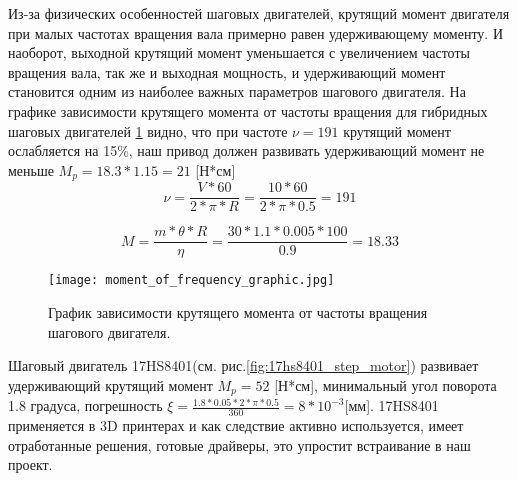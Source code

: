 Из-за физических особенностей шаговых двигателей, крутящий момент двигателя при малых частотах вращения вала примерно равен удерживающему моменту. И наоборот, выходной крутящий момент уменьшается с увеличением частоты вращения вала, так же и выходная мощность, и удерживающий момент становится одним из наиболее важных параметров шагового двигателя. На графике зависимости крутящего момента от частоты вращения для гибридных шаговых двигателей \ref{fig:MomentFrequency} видно, что при частоте $\nu=191$ крутящий момент ослабляется на 15\%, наш привод должен развивать удерживающий момент не меньше $M_{p}=18.3*1.15=21$ [Н*см]
\begin{equation}
\label{eq:frec}
\nu =\frac{V*60}{2*\pi*R}= \frac{10*60}{2*\pi*0.5}=191
\end{equation}

\begin{equation}
\label{eq:moment}
M=\frac{m*\theta*R}{\eta}= \frac{30*1.1*0.005*100}{0.9}=18.33
\end{equation}

\begin{figure}[ht]
	\centering
     \texttt{[image: moment\_of\_frequency\_graphic.jpg]}
	\caption{График зависимости крутящего момента от частоты вращения шагового двигателя.}
	\label{fig:MomentFrequency}
\end{figure}

Шаговый двигатель 17HS8401(см. рис.\ref{fig:17hs8401_step_motor}) развивает удерживающий крутящий момент $M_{p}=52$ [Н*см], минимальный угол поворота 1.8 градуса, погрешность $\xi=\frac{1.8*0.05*2*\pi*0.5}{360}=8*10^{-3} $[мм]. 17HS8401 применяется в 3D принтерах и как следствие активно используется, имеет отработанные решения, готовые драйверы, это упростит встраивание в наш проект.

